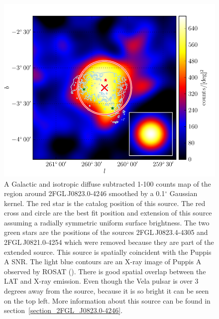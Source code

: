 \documentclass[12pt,preprint]{aastex}
\newcommand{\gev}{\text{GeV}\xspace}
\renewcommand{\deg}{\ensuremath{^\circ}\xspace}
\begin{document}
\begin{figure}
  \begin{center}
    \includegraphics[type=pdf,ext=.pdf,read=.pdf]{source_plots/source_1FGL_J0823.3-4248}
  \end{center}
  \caption{A Galactic and isotropic diffuse subtracted 1-100
  \gev counts map of the region around 2FGL\,J0823.0-4246 smoothed by a
  0.1\deg Gaussian kernel.  The red star is the catalog position of this source.  
  The red cross and circle are the best fit position
  and extension of this source assuming a radially
  symmetric uniform surface brightness.
  The two green stars are the positions of the sources 2FGL\,J0823.4-4305
  and 2FGL\,J0821.0-4254 which were removed because they are part of the
  extended source.  This source is spatially coincident with the Puppis
  A SNR. The light blue contours are an X-ray image of Puppis A observed by
  ROSAT (\cite{rosat_puppis_a}). There is good spatial overlap between
  the LAT and X-ray emission.  Even though the Vela pulsar is over 3
  degrees away from the source, because it is so bright it can be seen
  on the top left.  More information about this source can be found in 
  section~\ref{section_2FGL_J0823.0-4246}.
  }\label{1FGL_J0823.3-4248}
\end{figure}
\end{document}
